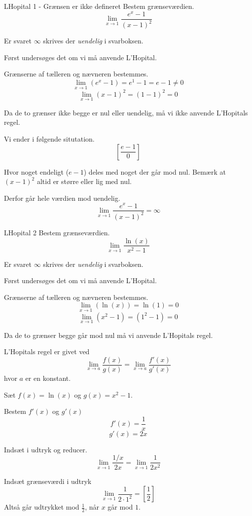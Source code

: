 \documentclass{article}
\begin{document}
\tableofcontents
\newpage

\begin{exercise}{LHopital 1 - Grænsen er ikke defineret}
Bestem grænseværdien.
\[
\lim_{x \to 1} \frac{e^x - 1}{(x - 1)^2}
\]

Er svaret $\infty$ skrives der \emph{uendelig} i svarboksen.


\hint
Først undersøges det om vi må anvende L'Hopital.

\hint
Grænserne af tælleren og nævneren bestemmes.
\[
\lim_{x \to 1} (e^x - 1) = e^1 - 1 = e - 1 \neq 0
\]
\[
\lim_{x \to 1} (x - 1)^2 = (1 - 1)^2 = 0
\]

\hint
Da de to grænser ikke begge er nul eller uendelig, må vi ikke anvende L'Hopitals regel.

\hint
Vi ender i følgende situtation.
\[
\left[ \frac{e - 1}{0} \right]
\]

\hint
Hvor noget endeligt ($e - 1$) deles med noget der går mod nul.
Bemærk at $(x - 1)^2$ altid er større eller lig med nul.

Derfor går hele værdien mod uendelig.
\[
\lim_{x \to 1} \frac{e^x - 1}{(x - 1)^2} = \infty
\]

\end{exercise}

\begin{exercise}{LHopital 2}
Bestem grænseværdien.
\[
\lim_{x \to 1} \frac{\ln(x)}{x^2 - 1}
\]

Er svaret $\infty$ skrives der \emph{uendelig} i svarboksen.


\hint
Først undersøges det om vi må anvende L'Hopital.

\hint
Grænserne af tælleren og nævneren bestemmes.
\[
\lim_{x \to 1} (\ln(x)) = \ln(1) = 0
\]
\[
\lim_{x \to 1} (x^2 - 1) = (1^2 - 1) = 0
\]

\hint
Da de to grænser begge går mod nul må vi anvende L'Hopitals regel.

\hint
L'Hopitals regel er givet ved
\[
\lim_{x \to a} \frac{f(x)}{g(x)} = \lim_{x \to a} \frac{f'(x)}{g'(x)}
\]
hvor $a$ er en konstant.

\hint
Sæt $f(x) = \ln(x)$ og $g(x) = x^2 - 1$.

\hint
Bestem $f'(x)$ og $g'(x)$
\[
f'(x) = \frac{1}{x}
\]
\[
g'(x) = 2x
\]


\hint
Indsæt i udtryk og reducer.
\[
\lim_{x \to 1} \frac{1/x}{2x} = \lim_{x \to 1} \frac{1}{2x^2}
\]

\hint
Indsæt grænseværdi i udtryk
\[
\lim_{x \to 1} \frac{1}{2 \cdot 1^2} = \left[ \frac{1}{2} \right]
\]
Altså går udtrykket mod $\frac{1}{2}$, når $x$ går mod $1$.

\end{exercise}
\end{document}
